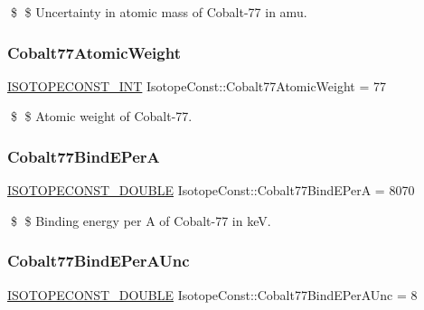 \$ \$ Uncertainty in atomic mass of Cobalt-\/77 in amu. \mbox{\label{group___isotope_const-_cobalt-_co77_gaa9cc1918935c15b1644fc905793c43db}} 
\subsubsection{\texorpdfstring{Cobalt77\+Atomic\+Weight}{Cobalt77AtomicWeight}}
{\footnotesize\ttfamily \mbox{\hyperlink{group___isotope_const-_macros_ga5f18360b3e99483a35c32d789e62621c}{I\+S\+O\+T\+O\+P\+E\+C\+O\+N\+S\+T\+\_\+\+I\+NT}} Isotope\+Const\+::\+Cobalt77\+Atomic\+Weight = 77}

\$ \$ Atomic weight of Cobalt-\/77. \mbox{\label{group___isotope_const-_cobalt-_co77_gac554304c415520cb6d50227bdb68722a}} 
\subsubsection{\texorpdfstring{Cobalt77\+Bind\+E\+PerA}{Cobalt77BindEPerA}}
{\footnotesize\ttfamily \mbox{\hyperlink{group___isotope_const-_macros_ga8f45a7272ce02c0b4c65c44636ed719a}{I\+S\+O\+T\+O\+P\+E\+C\+O\+N\+S\+T\+\_\+\+D\+O\+U\+B\+LE}} Isotope\+Const\+::\+Cobalt77\+Bind\+E\+PerA = 8070}

\$ \$ Binding energy per A of Cobalt-\/77 in keV. \mbox{\label{group___isotope_const-_cobalt-_co77_ga87c22bf2d6d9f2d0bc98cf04ba40f49d}} 
\subsubsection{\texorpdfstring{Cobalt77\+Bind\+E\+Per\+A\+Unc}{Cobalt77BindEPerAUnc}}
{\footnotesize\ttfamily \mbox{\hyperlink{group___isotope_const-_macros_ga8f45a7272ce02c0b4c65c44636ed719a}{I\+S\+O\+T\+O\+P\+E\+C\+O\+N\+S\+T\+\_\+\+D\+O\+U\+B\+LE}} Isotope\+Const\+::\+Cobalt77\+Bind\+E\+Per\+A\+Unc = 8}

